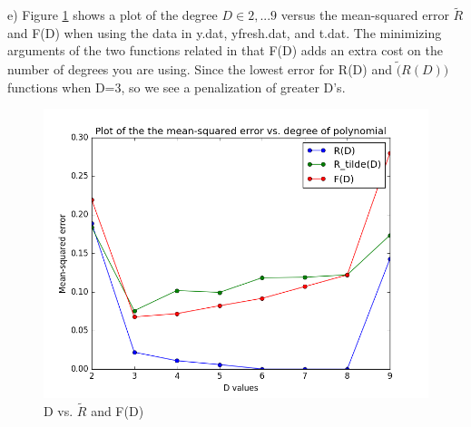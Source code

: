 \documentclass[11pt]{article}
\newenvironment{problem}[2][Problem]{\begin{trivlist}
\item[\hskip \labelsep {\bfseries #1}\hskip \labelsep {\bfseries #2.}]}{\end{trivlist}}
\begin{document}
\begin{problem}{2.1}
(e) Figure \ref{fig:2e} shows a plot of the degree $D \in {2,...9}$ versus the mean-squared error $\tilde{R}$ and F(D) when using the data in y.dat, yfresh.dat, and t.dat. The minimizing arguments of the two functions related in that F(D) adds an extra cost on the number of degrees you are using. Since the lowest error for R(D) and $\tilde(R(D))$ functions when D=3, so we see a penalization of greater D's. 
\begin{figure}[h!]
  \centering
  \includegraphics[scale=0.5]{figs/2e_2.png}
  \caption{D vs. $\tilde{R}$ and F(D)}
  \label{fig:2e}
\end{figure}

\end{problem}
 
\end{document}
